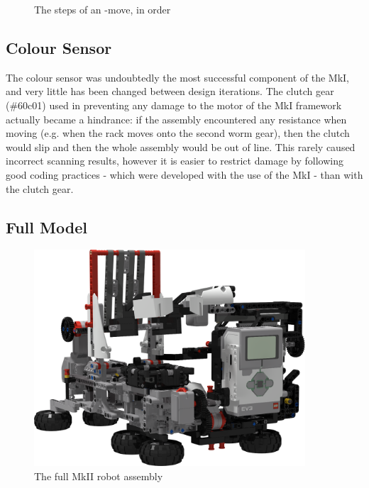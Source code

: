 \documentclass{report}
\newcommand{\legopiece}[1]{(\##1)}
\newcommand{\move}[1]{\uppercase{\texttt{\formatmovesnospace{#1}}}-move}
\begin{document}
\begin{figure}[H]
\begin{subfigure}[b]{0.25\textwidth}
    		\caption{}
    		\label{fig:rdrXMoveArmRaised}
    	\end{subfigure}
    	\caption{The steps of an \move{x}, in order}
    	\label{fig:rdrXMoveRenders}
    \end{figure}
    
    
    \subsection{Colour Sensor}
    
    The colour sensor was undoubtedly the most successful component of the MkI, and very little has been changed between design iterations. The clutch gear \legopiece{60c01} used in preventing any damage to the motor of the MkI framework actually became a hindrance: if the assembly encountered any resistance when moving (e.g. when the rack moves onto the second worm gear), then the clutch would slip and then the whole assembly would be out of line. This rarely caused incorrect scanning results, however it is easier to restrict damage by following good coding practices - which were developed with the use of the MkI - than with the clutch gear.
    
    \subsection{Full Model}
    
   	\begin{figure}[H]
    	\centering
   		\includegraphics[width=0.9\textwidth]{Resources/Images/rdrMkIIFull.png}
   		\caption{The full MkII robot assembly}
   		\label{fig:rdrMkIIFull}
    \end{figure}
    
\end{document}
